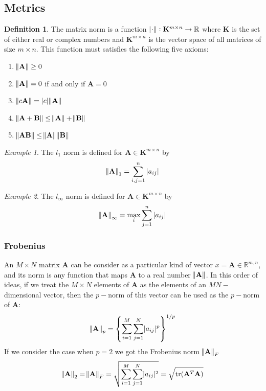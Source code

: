 \documentclass[11pt]{article}
\theoremstyle{definition}
\newtheorem{definition}{Definition}[section]
\theoremstyle{remark}
\theoremstyle{remark}
\theoremstyle{remark}
\newtheorem{example}{Example}
\newcommand{\R}{{\mathbb{R}}}
\begin{document}
\subsection{Metrics}
\begin{definition}
The matrix norm is a function $\norm{\cdot}: \mathbf{K}^{m \times n} \to \R$ where $\mathbf{K}$ is the set of either real or complex numbers and $\mathbf{K}^{m \times n}$ is the vector space of all matrices of size $m \times n$. This function must satisfies the following five axioms:
\begin{enumerate}
    \item $\norm{\mathbf{A}} \geq 0$
    \item $\norm{\mathbf{A}} = 0$ if and only if $\mathbf{A} = 0$
    \item $\norm{c\mathbf{A}} = |c|\norm{\mathbf{A}}$
    \item $\norm{\mathbf{A} + \mathbf{B}} \leq \norm{\mathbf{A}} + \norm{\mathbf{B}}$
    \item $\norm{\mathbf{AB}} \leq \norm{\mathbf{A}}\norm{\mathbf{B}}$
\end{enumerate}
\end{definition}

\begin{example}
The $l_{1}$ norm is defined for $\mathbf{A} \in \mathbf{K}^{m \times n}$ by
%
\[
\norm{\mathbf{A}}_{1} = \sum_{i,j = 1}^{n} |a_{ij}|
\]
\end{example}

\begin{example}
The $l_{\infty}$ norm is defined for $\mathbf{A} \in \mathbf{K}^{m \times n}$ by 
%
\[
\norm{\mathbf{A}}_{\infty} = \max_{i}{\sum_{j = 1}^{n} |a_{ij}|}
\]

\end{example}

\subsubsection{Frobenius}
An $M \times N$ matrix $\mathbf{A}$ can be consider as a particular kind of vector $x = \mathbf{A} \in \R^{m,n}$, and its norm is any function that maps $\mathbf{A}$ to a real number $\norm{\mathbf{A}}$. In this order of ideas, if we treat the $M \times N$ elements of $\mathbf{A}$ as the elements of an $MN-$dimensional vector, then the $p-$norm of this vector can be used as the $p-$norm of $\mathbf{A}$:
%
\[
\norm{\mathbf{A}}_{p} = \left\{ \sum_{i = 1}^{M} \sum_{j=1}^{N} \lvert a_{ij} \rvert^{p} \right\}^{1/p}
\]
%
If we consider the case when $p = 2$ we got the Frobenius norm $\norm{\mathbf{A}}_{F}$
%
\[
\norm{\mathbf{A}}_{2} = \norm{\mathbf{A}}_{F} = \sqrt{\sum_{i=1}^{M} \sum_{j=1}^{N} \lvert a_{ij} \rvert^{2}} = \sqrt{\mathrm{tr}(\mathbf{A}^{T}\mathbf{A})}
\]
\end{document}
